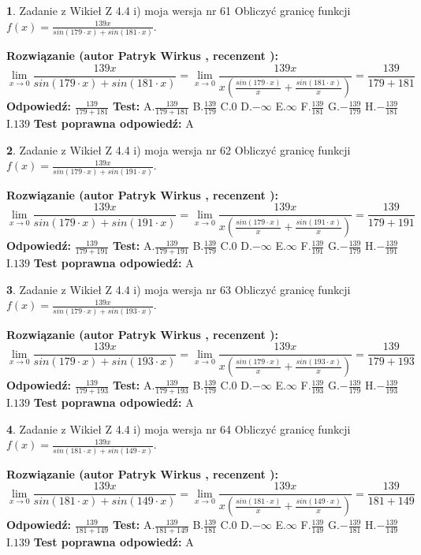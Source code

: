 \documentclass[12pt, a4paper]{article}
\theoremstyle{definition} %
\newtheorem{zad}{}
\newcommand{\zadStart}[1]{\begin{zad}#1\newline}
\newcommand{\zadStop}{\end{zad}}
\newcommand{\rozwStart}[2]{\noindent \textbf{Rozwiązanie (autor #1 , recenzent #2): }\newline}
\newcommand{\rozwStop}{\newline}
\newcommand{\odpStart}{\noindent \textbf{Odpowiedź:}\newline}
\newcommand{\odpStop}{\newline}
\newcommand{\testStart}{\noindent \textbf{Test:}\newline}
\newcommand{\testStop}{\newline}
\newcommand{\kluczStart}{\noindent \textbf{Test poprawna odpowiedź:}\newline}
\newcommand{\kluczStop}{\newline}
\begin{document}
\zadStart{Zadanie z Wikieł Z 4.4 i) moja wersja nr 61}
Obliczyć granicę funkcji $f(x)=\frac{139x}{sin(179\cdot x) +sin(181\cdot x)}$.
\zadStop
\rozwStart{Patryk Wirkus}{}
$$\lim\limits_{x\to 0}\frac{139x}{sin(179\cdot x) +sin(181\cdot x)}=\lim\limits_{x\to 0}\frac{139x}{x(\frac{sin(179\cdot x)}{x}+\frac{sin(181\cdot x)}{x})}=\frac{139}{179+181}$$
\rozwStop
\odpStart
$\frac{139}{179+181}$
\odpStop
\testStart
A.$\frac{139}{179+181}$
B.$\frac{139}{179}$
C.$0$
D.$-\infty$
E.$\infty$
F.$\frac{139}{181}$
G.$-\frac{139}{179}$
H.$-\frac{139}{181}$
I.$139$
\testStop
\kluczStart
A
\kluczStop



\zadStart{Zadanie z Wikieł Z 4.4 i) moja wersja nr 62}
Obliczyć granicę funkcji $f(x)=\frac{139x}{sin(179\cdot x) +sin(191\cdot x)}$.
\zadStop
\rozwStart{Patryk Wirkus}{}
$$\lim\limits_{x\to 0}\frac{139x}{sin(179\cdot x) +sin(191\cdot x)}=\lim\limits_{x\to 0}\frac{139x}{x(\frac{sin(179\cdot x)}{x}+\frac{sin(191\cdot x)}{x})}=\frac{139}{179+191}$$
\rozwStop
\odpStart
$\frac{139}{179+191}$
\odpStop
\testStart
A.$\frac{139}{179+191}$
B.$\frac{139}{179}$
C.$0$
D.$-\infty$
E.$\infty$
F.$\frac{139}{191}$
G.$-\frac{139}{179}$
H.$-\frac{139}{191}$
I.$139$
\testStop
\kluczStart
A
\kluczStop



\zadStart{Zadanie z Wikieł Z 4.4 i) moja wersja nr 63}
Obliczyć granicę funkcji $f(x)=\frac{139x}{sin(179\cdot x) +sin(193\cdot x)}$.
\zadStop
\rozwStart{Patryk Wirkus}{}
$$\lim\limits_{x\to 0}\frac{139x}{sin(179\cdot x) +sin(193\cdot x)}=\lim\limits_{x\to 0}\frac{139x}{x(\frac{sin(179\cdot x)}{x}+\frac{sin(193\cdot x)}{x})}=\frac{139}{179+193}$$
\rozwStop
\odpStart
$\frac{139}{179+193}$
\odpStop
\testStart
A.$\frac{139}{179+193}$
B.$\frac{139}{179}$
C.$0$
D.$-\infty$
E.$\infty$
F.$\frac{139}{193}$
G.$-\frac{139}{179}$
H.$-\frac{139}{193}$
I.$139$
\testStop
\kluczStart
A
\kluczStop



\zadStart{Zadanie z Wikieł Z 4.4 i) moja wersja nr 64}
Obliczyć granicę funkcji $f(x)=\frac{139x}{sin(181\cdot x) +sin(149\cdot x)}$.
\zadStop
\rozwStart{Patryk Wirkus}{}
$$\lim\limits_{x\to 0}\frac{139x}{sin(181\cdot x) +sin(149\cdot x)}=\lim\limits_{x\to 0}\frac{139x}{x(\frac{sin(181\cdot x)}{x}+\frac{sin(149\cdot x)}{x})}=\frac{139}{181+149}$$
\rozwStop
\odpStart
$\frac{139}{181+149}$
\odpStop
\testStart
A.$\frac{139}{181+149}$
B.$\frac{139}{181}$
C.$0$
D.$-\infty$
E.$\infty$
F.$\frac{139}{149}$
G.$-\frac{139}{181}$
H.$-\frac{139}{149}$
I.$139$
\testStop
\kluczStart
A
\kluczStop
\end{document}

